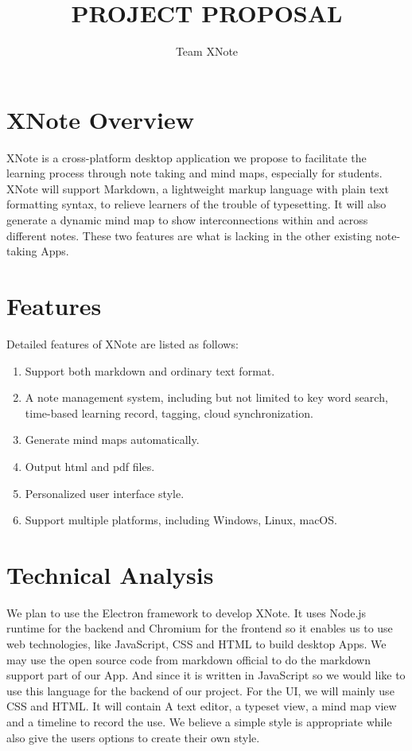 \documentclass{article}
\title{PROJECT PROPOSAL}
\author{Team XNote}
\begin{document}
\maketitle

\section{XNote Overview}
XNote is a cross-platform desktop application we propose to facilitate the learning process through note taking and mind maps, especially for students. XNote will support Markdown, a lightweight markup language with plain text formatting syntax, to relieve learners of the trouble of typesetting. It will also generate a dynamic mind map to show interconnections within and across different notes. These two features are what is lacking in the other existing note-taking Apps. 

\section{Features}
Detailed features of XNote are listed as follows:
\begin{enumerate}
	\item Support both markdown and ordinary text format.
	\item A note management system, including but not limited to key word search, time-based learning record, tagging, cloud synchronization.
	\item Generate mind maps automatically.
	\item Output html and pdf files.
	\item Personalized user interface style.
	\item Support multiple platforms, including Windows, Linux, macOS.
\end{enumerate}

\section{Technical Analysis}
We plan to use the Electron framework to develop XNote. It uses Node.js runtime for the backend and Chromium for the frontend so it enables us to use web technologies, like JavaScript, CSS and HTML to build desktop Apps. We may use the open source code from markdown official to do the markdown support part of our App. And since it is written in JavaScript so we would like to use this language for the backend of our project. For the UI, we will mainly use CSS and HTML. It will contain A text editor, a typeset view, a mind map view and a timeline to record the use. We believe a simple style is appropriate while also give the users options to create their own style.
\end{document}
